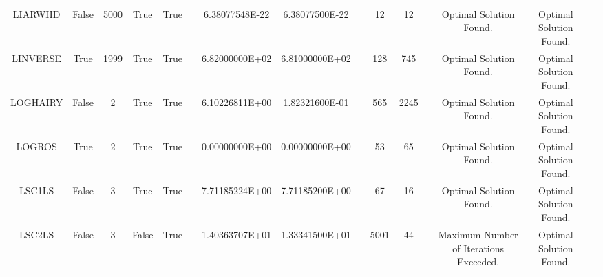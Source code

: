 \begin{longtable}{ccccccccccccccc}
	\cellcolor{default2} LIARWHD& \cellcolor{default2} False& \cellcolor{default2} 5000& \cellcolor{default2} True& \cellcolor{default2} True& \cellcolor{header} & \cellcolor{ok} 6.38077548E-22& \cellcolor{best} 6.38077500E-22& \cellcolor{header} & \cellcolor{best} 12& \cellcolor{best} 12& \cellcolor{header} & \cellcolor{default2} Optimal Solution Found.& \cellcolor{default2} Optimal Solution Found.& \cellcolor{header} \\
	\cellcolor{default1} LINVERSE& \cellcolor{default1} True& \cellcolor{default1} 1999& \cellcolor{default1} True& \cellcolor{default1} True& \cellcolor{header} & \cellcolor{poor} 6.82000000E+02& \cellcolor{best} 6.81000000E+02& \cellcolor{header} & \cellcolor{best} 128& \cellcolor{poor} 745& \cellcolor{header} & \cellcolor{default1} Optimal Solution Found.& \cellcolor{default1} Optimal Solution Found.& \cellcolor{header} \\
	\cellcolor{default2} LOGHAIRY& \cellcolor{default2} False& \cellcolor{default2} 2& \cellcolor{default2} True& \cellcolor{default2} True& \cellcolor{header} & \cellcolor{poor} 6.10226811E+00& \cellcolor{best} 1.82321600E-01& \cellcolor{header} & \cellcolor{best} 565& \cellcolor{poor} 2245& \cellcolor{header} & \cellcolor{default2} Optimal Solution Found.& \cellcolor{default2} Optimal Solution Found.& \cellcolor{header} \\
	\cellcolor{default1} LOGROS& \cellcolor{default1} True& \cellcolor{default1} 2& \cellcolor{default1} True& \cellcolor{default1} True& \cellcolor{header} & \cellcolor{best} 0.00000000E+00& \cellcolor{best} 0.00000000E+00& \cellcolor{header} & \cellcolor{best} 53& \cellcolor{ok} 65& \cellcolor{header} & \cellcolor{default1} Optimal Solution Found.& \cellcolor{default1} Optimal Solution Found.& \cellcolor{header} \\
	\cellcolor{default2} LSC1LS& \cellcolor{default2} False& \cellcolor{default2} 3& \cellcolor{default2} True& \cellcolor{default2} True& \cellcolor{header} & \cellcolor{ok} 7.71185224E+00& \cellcolor{best} 7.71185200E+00& \cellcolor{header} & \cellcolor{poor} 67& \cellcolor{best} 16& \cellcolor{header} & \cellcolor{default2} Optimal Solution Found.& \cellcolor{default2} Optimal Solution Found.& \cellcolor{header} \\
	\cellcolor{default1} LSC2LS& \cellcolor{default1} False& \cellcolor{default1} 3& \cellcolor{default1} False& \cellcolor{default1} True& \cellcolor{header} & \cellcolor{poor} 1.40363707E+01& \cellcolor{best} 1.33341500E+01& \cellcolor{header} & \cellcolor{poor} 5001& \cellcolor{best} 44& \cellcolor{header} & \cellcolor{default1} Maximum Number of Iterations Exceeded.& \cellcolor{default1} Optimal Solution Found.& \cellcolor{header} \\

\end{longtable}
